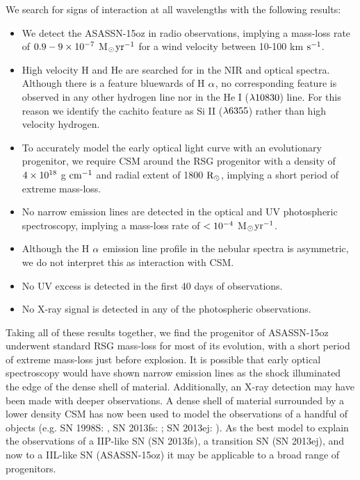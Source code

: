 \documentclass[a4paper,fleqn,usenatbib]{mnras}
\newcommand{\msunperiod}{M$\rm{_{\odot}}$}
\begin{document}
We search for signs of interaction at all wavelengths with the following results:
\begin{itemize}
\item We detect the ASASSN-15oz in radio observations, implying a mass-loss rate of $\rm{0.9-9\times10^{-7}}$ \msunperiod $\rm{yr^{-1}}$ for a wind velocity between 10-100 km $\rm{s^{-1}}$.
\item High velocity H and He are searched for in the NIR and optical spectra. 
Although there is a feature bluewards of H $\rm{\alpha}$, no corresponding feature is observed in any other hydrogen line nor in the He I ($\rm{\lambda 10830}$) line. 
For this reason we identify the cachito feature as Si II ($\rm{\lambda 6355}$) rather than high velocity hydrogen.
\item To accurately model the early optical light curve with an evolutionary progenitor, we require CSM around the RSG progenitor with a density of $\rm{4\times10^{18}}$ g $\rm{cm^{-1}}$ and radial extent of 1800 $\rm{R_{\odot}}$, implying a short period of extreme mass-loss.
\item No narrow emission lines are detected in the optical and UV photospheric spectroscopy, implying a mass-loss rate of $\rm{< 10^{-4}}$ \msunperiod $\rm{yr^{-1}}$.
\item Although the H $\rm{\alpha}$ emission line profile in the nebular spectra is asymmetric, we do not interpret this as interaction with CSM.
\item No UV excess is detected in the first 40 days of observations.
\item No X-ray signal is detected in any of the photospheric observations.
\end{itemize}
Taking all of these results together, we find the progenitor of ASASSN-15oz underwent standard RSG mass-loss for most of its evolution, with a short period of extreme mass-loss just before explosion. 
It is possible that early optical spectroscopy would have shown narrow emission lines as the shock illuminated the edge of the dense shell of material.
Additionally, an X-ray detection may have been made with deeper observations. 
A dense shell of material surrounded by a lower density CSM has now been used to model the observations of a handful of objects (e.g. SN 1998S: \citealt{2001chugai}, SN 2013fs: \citealt{2017yaron}; SN 2013ej: \citealt{2018morozova2}).
As the best model to explain the observations of a IIP-like SN (SN 2013fs), a transition SN (SN 2013ej), and now to a IIL-like SN (ASASSN-15oz) it may be applicable to a broad range of progenitors.
\end{document}
